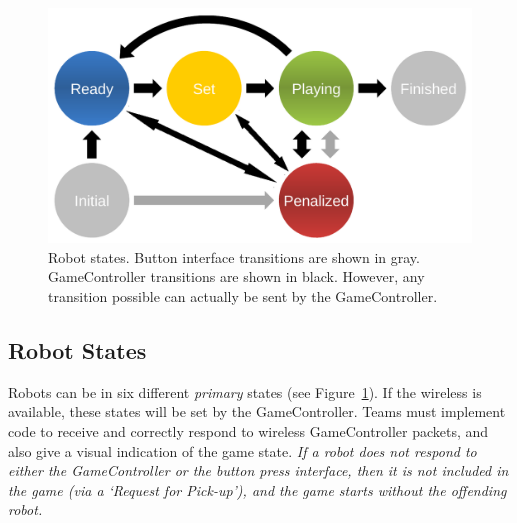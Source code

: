 \documentclass[12pt]{article}
\newcommand{\cf}{see\xspace}
\begin{document}
\begin{figure}[t]
\centerline{\includegraphics[width=0.9\columnwidth]{figs/states.pdf}}
\caption{Robot states. Button interface transitions are shown in gray. GameController transitions are shown in black. However, any transition possible can actually be sent by the GameController.}
\label{fig:robot_states}
\end{figure}

\subsection{Robot States}
\label{sec:robot_states}

Robots can be in six different \emph{primary} states (\cf Figure~\ref{fig:robot_states}). If the wireless is available, these states will be set by the GameController. Teams must implement code to receive and correctly respond to wireless GameController packets, and also give a visual indication of the game state.
\emph{If a robot does not respond to either the GameController or the button press interface, then it is not included in the game (via a `Request for Pick-up'), and the game starts without the offending robot.}
\end{document}
